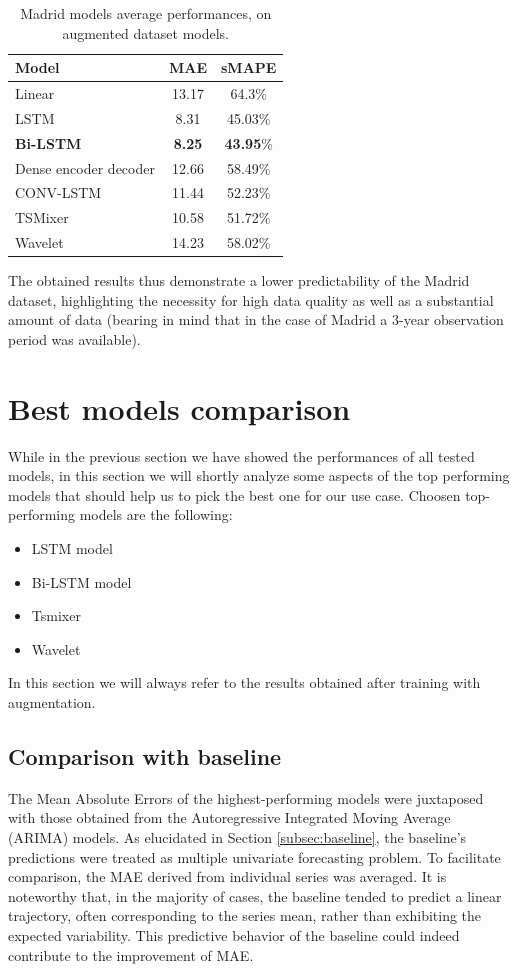 \begin{table}[]
    \centering
    \begin{tabular}{lcc}
        \toprule
        \textbf{Model} & \textbf{MAE} & \textbf{sMAPE} \\ 
        \midrule
        Linear & 13.17 & 64.3\% \\
        LSTM & 8.31 & 45.03\% \\
       \textbf{Bi-LSTM}& \textbf{8.25} & \textbf{43.95}\% \\
        Dense encoder decoder & 12.66 & 58.49\% \\
        CONV-LSTM & 11.44 & 52.23\% \\
        TSMixer & 10.58 & 51.72\% \\
        Wavelet & 14.23 & 58.02\% \\ 
        \bottomrule
    \end{tabular}
    \caption{Madrid models average performances, on augmented dataset models.}
    \label{tab:Madrid_performances}
\end{table}

The obtained results thus demonstrate a lower predictability of the Madrid dataset, highlighting the necessity for high data quality as well as a substantial amount of data (bearing in mind that in the case of Madrid a 3-year observation period was available).

\section{Best models comparison}

While in the previous section we have showed the performances of all tested models, in this section we will shortly analyze some aspects of the top performing models that should help us to pick the best one for our use case. Choosen top-performing models are the following:
\begin{itemize}
    \item LSTM model
    \item Bi-LSTM model
    \item Tsmixer
    \item Wavelet
\end{itemize}

In this section we will always refer to the results obtained after training with augmentation.

\subsection{Comparison with baseline}
\label{subsec:baseline_comparison}
The Mean Absolute Errors of the highest-performing models were juxtaposed with those obtained from the Autoregressive Integrated Moving Average (ARIMA) models. As elucidated in Section \ref{subsec:baseline}, the baseline's predictions were treated as multiple univariate forecasting problem. To facilitate comparison, the MAE derived from individual series was averaged. It is noteworthy that, in the majority of cases, the baseline tended to predict a linear trajectory, often corresponding to the series mean, rather than exhibiting the expected variability. This predictive behavior of the baseline could indeed contribute to the improvement of MAE.

